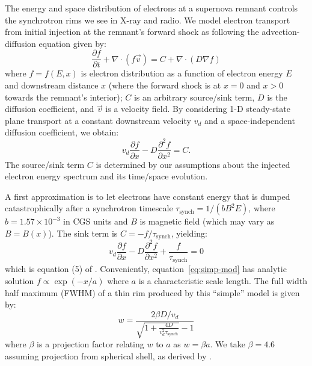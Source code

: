 \documentclass[iop, apj, numberedappendix, twocolappendix]{emulateapj}
\newcommand*{\mt}{\mathrm}
\newcommand*{\ptl}{\partial}
\newcommand*{\del}{\nabla}
\newcommand*{\tsynch}{\tau_{\mt{synch}}}
\begin{document}
The energy and space distribution of electrons at a supernova remnant
controls the synchrotron rims we see in X-ray and radio.  We model electron
transport from initial injection at the remnant's forward shock as following
the advection-diffusion equation given by:
\begin{equation}
  \frac{\ptl f}{\ptl t} + \del \cdot \left( f \vec{v} \right)
  = C + \del \cdot \left( D \del f \right)
\end{equation}
where $f = f(E,x)$ is electron distribution as a function of electron energy
$E$ and downstream distance $x$ (where the forward shock is at $x=0$ and
$x>0$ towards the remnant's interior); $C$ is an arbitrary source/sink term,
$D$ is the diffusion coefficient, and $\vec{v}$ is a velocity field.
By considering 1-D steady-state plane transport at a constant downstream
velocity $v_d$  and a space-independent diffusion
coefficient, we obtain:
\begin{equation}
    v_d \frac{\ptl f}{\ptl x} - D \frac{\ptl^2 f}{\ptl x^2} = C .
\end{equation}
The source/sink term $C$ is determined by our assumptions about the injected
electron energy spectrum and its time/space evolution.

A first approximation is to let electrons have constant energy that is dumped
catastrophically after a synchrotron timescale $\tsynch = 1/(b B^2 E)$, where
$b = 1.57 \times 10^{-3}$ in CGS units and $B$ is magnetic field (which may
vary as $B=B(x)$).  The sink term is $C = -f / \tsynch$, yielding:
\begin{equation} \label{eq:simp-mod}
    v_d \frac{\ptl f}{\ptl x} - D \frac{\ptl^2 f}{\ptl x^2} +
    \frac{f}{\tau_{\mt{synch}}} = 0
\end{equation}
which is equation (5) of .
Conveniently, equation~\eqref{eq:simp-mod} has analytic solution $f \propto
\exp(-x/a)$ where $a$ is a characteristic scale length.  The full width half
maximum (FWHM) of a thin rim produced by this ``simple'' model is given by:
\begin{equation} \label{eq:simp-fwhm}
    w = \frac{2\beta D / v_d}{\sqrt{1 +\frac{4D}{v_d^2 \tsynch}} - 1}
\end{equation}
where $\beta$ is a projection factor relating $w$ to $a$ as $w = \beta a$.  We
take $\beta = 4.6$ assuming projection from spherical shell, as derived by
\citet{ballet2006}.
\end{document}
